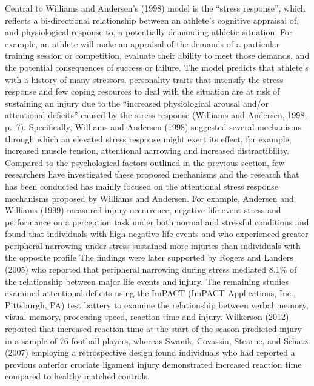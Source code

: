 \documentclass[man,floatsintext]{apa6}
\begin{document}
Central to Williams and Andersen's (1998) model is the \enquote{stress response}, which reflects a bi-directional relationship between an athlete's cognitive appraisal of, and physiological response to, a potentially demanding athletic situation.
For example, an athlete will make an appraisal of the demands of a particular training session or competition, evaluate their ability to meet those demands, and the potential consequences of success or failure.
The model predicts that athlete's with a history of many stressors, personality traits that intensify the stress response and few coping resources to deal with the situation are at risk of sustaining an injury due to the \enquote{increased physiological arousal and/or attentional deficits} caused by the stress response (Williams and Andersen, 1998, p.~7).
Specifically, Williams and Andersen (1998) suggested several mechanisms through which an elevated stress response might exert its effect, for example, increased muscle tension, attentional narrowing and increased distractibility. Compared to the psychological factors outlined in the previous section, few researchers have investigated these proposed mechanisms and the research that has been conducted has mainly focused on the attentional stress response mechanisms proposed by Williams and Andersen.
For example, Andersen and Williams (1999)
measured injury occurrence, negative life event stress and performance on a perception task under both normal and stressful conditions and found that individuals with high negative life events and who experienced greater peripheral narrowing under stress sustained more injuries than individuals with the opposite profile
The findings were later supported by Rogers and Landers (2005)
who reported that peripheral narrowing during stress mediated 8.1\% of the relationship between major life events and injury.
The remaining studies examined attentional deficits using the ImPACT (ImPACT Applications, Inc., Pittsburgh, PA) test battery to examine the relationship between verbal memory, visual memory, processing speed, reaction time and injury. Wilkerson (2012)
reported that increased reaction time at the start of the season predicted injury in a sample of 76 football players, whereas Swanik, Covassin, Stearne, and Schatz (2007)
employing a retrospective design found individuals who had reported a previous anterior cruciate ligament injury demonstrated increased reaction time compared to healthy matched controls.
\end{document}
